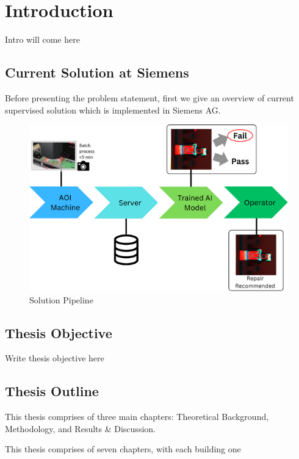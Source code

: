 \chapter{Introduction}
\label{sec:introduction}

Intro will come here

\section{Current Solution at Siemens}
\label{subsec:current solution at siemens}

Before presenting the problem statement, first we give an overview of current supervised solution which is implemented in Siemens AG.

\begin{figure}[ht!]
    \centering
    \includegraphics[width=1\linewidth]{Images/Solution_Pipeline.png}
    \caption{Solution Pipeline}
    \label{fig:solution pipeline}
\end{figure}

\section{Thesis Objective}

Write thesis objective here

\section{Thesis Outline}
This thesis comprises of three main chapters: Theoretical Background, Methodology, and Results \& Discussion.

This thesis comprises of seven chapters, with each building one
